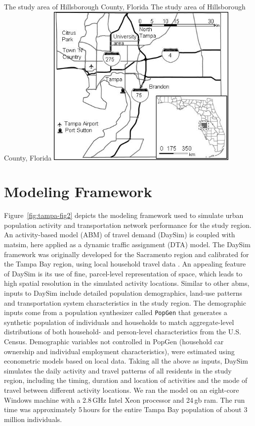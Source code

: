 \createfigure%
{The study area of Hillsborough County, Florida}%
{The study area of Hillsborough County, Florida}%
{\label{fig:tampa-fig1}}%
{\includegraphics[width=0.7\textwidth, angle=0]{./scenarios/figures/tampa-fig1.jpg}}%
{\citet[][]{GurramEtAl_AQAH_2015}}

\section{Modeling Framework}
Figure~\ref{fig:tampa-fig2} depicts the modeling framework used to simulate urban population activity and transportation network performance for the study region. 
An activity-based model (ABM) of travel demand (DaySim) is coupled with \gls{matsim}, here applied as a dynamic traffic assignment (DTA) model. 
The DaySim framework was originally developed for the Sacramento region \citep[][]{BradleyEtAl_JOCM_2010} and calibrated for the Tampa Bay region, using local household travel data \citep[][]{GliebeEtAl_TRB_2014}. 
An appealing feature of DaySim is its use of fine, parcel-level representation of space, which leads to high spatial resolution in the simulated activity locations.  
Similar to other \glspl{abm}, inputs to DaySim include detailed population demographics, land-use patterns and transportation system characteristics in the study region. The demographic inputs come from a population synthesizer called \lstinline|PopGen| \citep[][]{PendyalaEtAl_2011} that generates a synthetic population of individuals and households to match aggregate-level distributions of both household- and person-level characteristics from the U.S. Census. 
Demographic variables not controlled in PopGen (\eg household car ownership and individual employment characteristics), were estimated using econometric models based on local data. 
Taking all the above as inputs, DaySim simulates the daily activity and travel patterns of all residents in the study region, including the timing, duration and location of activities and the mode of travel between different activity locations. 
We ran the model on an eight-core Windows machine with a 2.8\,GHz Intel Xeon processor and 24\,\gls{gb} \gls{ram}. 
The run time was approximately 5\,hours for the entire Tampa Bay population of about 3\,million individuals.

